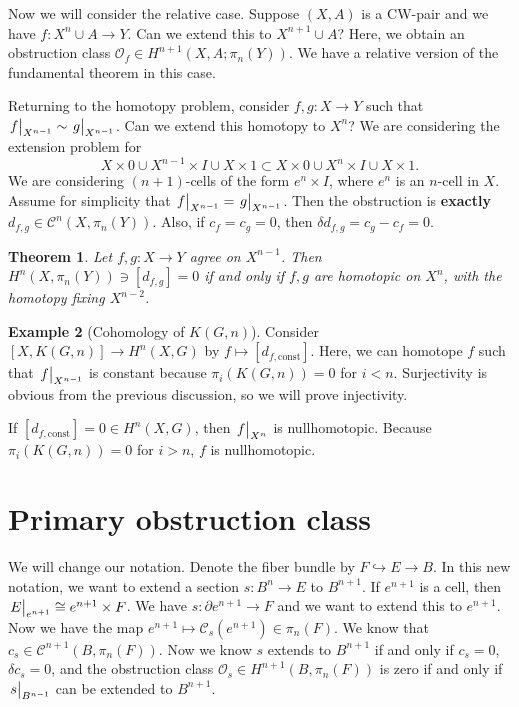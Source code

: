 \documentclass[leqno, openany]{memoir}
\newtheorem{thm}{Theorem}[section]
\theoremstyle{definition}
\newtheorem{exm}[thm]{Example}
\theoremstyle{remark}
\theoremstyle{plain}
\theoremstyle{definition}
\theoremstyle{remark}
\newcommand{\mc}[1]{\mathcal{#1}}
\begin{document}
Now we will consider the relative case. Suppose $(X, A)$ is a CW-pair and we have $f \colon X^n \cup A \to Y$. Can we extend this to $X^{n+1} \cup A$? Here, we obtain an obstruction class $\mc{O}_f \in H^{n+1}(X, A; \pi_n(Y))$. We have a relative version of the fundamental theorem in this case.

Returning to the homotopy problem, consider $f, g \colon X \to Y$ such that $\eval{f}_{X^{n-1}} \sim \eval{g}_{X^{n-1}}$. Can we extend this homotopy to $X^n$? We are considering the extension problem for
\[ X \times \qty{0} \cup X^{n-1} \times I \cup X \times \qty{1} \subset X \times \qty{0} \cup X^n \times I \cup X \times \qty{1}. \]
We are considering $(n+1)$-cells of the form $e^n \times I$, where $e^n$ is an $n$-cell in $X$. Assume for simplicity that $\eval{f}_{X^{n-1}} = \eval{g}_{X^{n-1}}$. Then the obstruction is \textbf{exactly} $d_{f,g} \in \mc{C}^n(X, \pi_n(Y))$. Also, if $c_f = c_g = 0$, then $\delta d_{f,g} = c_g - c_f = 0$.

\begin{thm}
    Let $f, g \colon X \to Y$ agree on $X^{n-1}$. Then $H^n(X, \pi_n(Y)) \ni [d_{f,g}] = 0$ if and only if $f,g$ are homotopic on $X^n$, with the homotopy fixing $X^{n-2}$.
\end{thm}

\begin{exm}[Cohomology of $K(G, n)$]
    Consider $[X, K(G, n)] \to H^n(X, G)$ by $f \mapsto [d_{f, \text{const}}]$. Here, we can homotope $f$ such that $\eval{f}_{X^{n-1}}$ is constant because $\pi_i(K(G, n)) = 0$ for $i < n$. Surjectivity is obvious from the previous discussion, so we will prove injectivity.

    If $[d_{f, \text{const}}] = 0 \in H^n(X, G)$, then $\eval{f}_{X^n}$ is nullhomotopic. Because $\pi_i(K(G, n)) = 0$ for $i > n$, $f$ is nullhomotopic.
\end{exm}

\section{Primary obstruction class}%
\label{sec:primary_obstruction_class}

We will change our notation. Denote the fiber bundle by $F \hookrightarrow E \to B$. In this new notation, we want to extend a section $s \colon B^n \to E$ to $B^{n+1}$. If $e^{n+1}$ is a cell, then $\eval{E}_{e^{n+1}} \cong e^{n+1} \times F$. We have $s \colon \partial e^{n+1} \to F$ and we want to extend this to $e^{n+1}$. Now we have the map $e^{n+1} \mapsto \mc{C}_s(e^{n+1}) \in \pi_n(F)$. We know that $c_s \in \mc{C}^{n+1}(B, \pi_n(F))$. Now we know $s$ extends to $B^{n+1}$ if and only if $c_s = 0$, $\delta c_s = 0$, and the obstruction class $\mc{O}_s \in H^{n+1}(B, \pi_n(F))$ is zero if and only if $\eval{s}_{B^{n-1}}$ can be extended to $B^{n+1}$.
\end{document}
